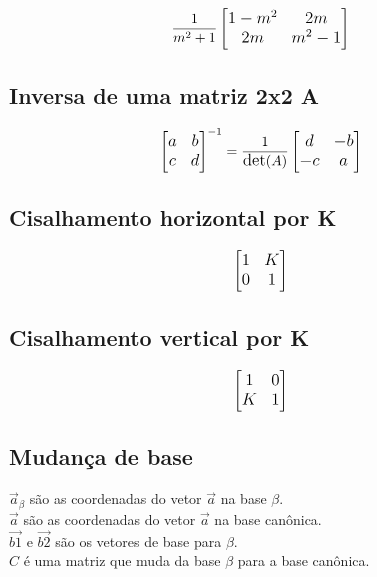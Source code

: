 \begin{equation*}
\large
\frac{1}{m^2+1} 
\begin{bmatrix}
    1 - m^2 & 2m \\
    2m & m^2 - 1
\end{bmatrix}
\end{equation*} 


\subsection{Inversa de uma matriz 2x2 A}

\begin{equation*} 
\large 
\begin{bmatrix}
    a & b \\
    c & d
\end{bmatrix}^{-1} =
\frac{1}{\text{det}(A)}
\begin{bmatrix}
    d & -b \\
    -c & a
\end{bmatrix}
\end{equation*}


\subsection{Cisalhamento horizontal por K}

\begin{equation*} 
\large
\begin{bmatrix}
    1 & K \\
    0 & 1
\end{bmatrix}
\end{equation*}


\subsection{Cisalhamento vertical por K}

\begin{equation*} 
\large
\begin{bmatrix}
    1 & 0 \\
    K & 1
\end{bmatrix}
\end{equation*}


\subsection{Mudança de base}

{\large $\vec{a}_\beta$ são as coordenadas do vetor $\vec{a}$ na base $\beta$.\\}
{\large $\vec{a}$ são as coordenadas do vetor $\vec{a}$ na base canônica.\\}
{\large $\vec{b1}$ e $\vec{b2}$ são os vetores de base para $\beta$.\\}
{\large $C$ é uma matriz que muda da base $\beta$ para a base canônica.}

